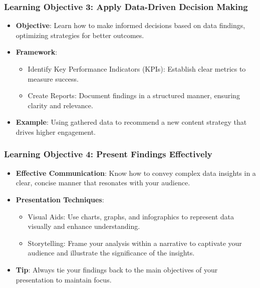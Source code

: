 \documentclass{beamer}
\begin{document}
\begin{frame}[fragile]
    \frametitle{Learning Objective 3: Apply Data-Driven Decision Making}
    \begin{itemize}
        \item \textbf{Objective}: Learn how to make informed decisions based on data findings, optimizing strategies for better outcomes.
        \item \textbf{Framework}:
        \begin{itemize}
            \item Identify Key Performance Indicators (KPIs): Establish clear metrics to measure success.
            \item Create Reports: Document findings in a structured manner, ensuring clarity and relevance.
        \end{itemize}
        \item \textbf{Example}: Using gathered data to recommend a new content strategy that drives higher engagement.
    \end{itemize}
\end{frame}

\begin{frame}[fragile]
    \frametitle{Learning Objective 4: Present Findings Effectively}
    \begin{itemize}
        \item \textbf{Effective Communication}: Know how to convey complex data insights in a clear, concise manner that resonates with your audience.
        \item \textbf{Presentation Techniques}:
        \begin{itemize}
            \item Visual Aids: Use charts, graphs, and infographics to represent data visually and enhance understanding.
            \item Storytelling: Frame your analysis within a narrative to captivate your audience and illustrate the significance of the insights.
        \end{itemize}
        \item \textbf{Tip}: Always tie your findings back to the main objectives of your presentation to maintain focus.
    \end{itemize}
\end{frame}
\end{document}
